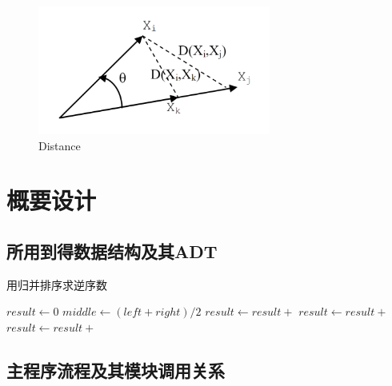 \documentclass[a4paper]{article}
\begin{document}
    \begin{figure}[htbp]
        \centering
        \includegraphics[height=120pt]{D}
        \caption{Distance}\label{fig:figure2}
    \end{figure}



    \section{概要设计}\label{sec:design1}

    \subsection{所用到得数据结构及其ADT}\label{subsec:adt}
    \begin{algorithm}
        \caption{用归并排序求逆序数}
        \begin{algorithmic}[1] %
                \State $result \gets 0$
                    \State $middle \gets (left + right) / 2$
                    \State $result \gets result +$ 
                    \State $result \gets result +$ 
                    \State $result \gets result +$ 
                \EndIf
                \State {}
            \EndFunction
        \end{algorithmic}\label{alg:algorithm}
    \end{algorithm}

    \subsection{主程序流程及其模块调用关系}\label{subsec:relate}
\end{document}
